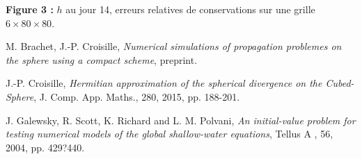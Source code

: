 \documentclass{sciposter}
\begin{document}
\begin{multicols}{3}
\begin{itemize}
\begin{center}
\textbf{Figure 3  : } $h$ au jour 14, erreurs relatives de conservations sur une grille $6 \times 80 \times 80$.
\end{center}









\end{itemize}




\begin{thebibliography}{99}
 {\sc M. Brachet, J.-P. Croisille}, \textit{Numerical simulations of propagation problemes on the sphere
using a compact scheme}, preprint.

 {\sc J.-P. Croisille}, \textit{Hermitian approximation of the spherical divergence on the Cubed-Sphere}, J.
Comp. App. Maths., 280, 2015, pp. 188-201.

 {\sc J. Galewsky, R. Scott, K. Richard and L. M. Polvani}, \textit{An initial-value problem for testing
numerical models of the global shallow-water equations}, Tellus A , 56, 2004, pp. 429?440.

\end{thebibliography}
\end{multicols}
\end{document}
